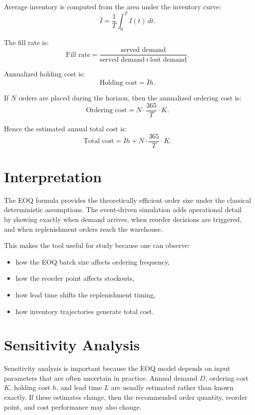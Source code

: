 \documentclass[11pt]{article}
\begin{document}
Average inventory is computed from the area under the inventory curve:
\begin{equation}
\bar{I} = \frac{1}{T}\int_0^T I(t)\,dt.
\end{equation}

The fill rate is:
\begin{equation}
\text{Fill rate} = \frac{\text{served demand}}{\text{served demand} + \text{lost demand}}.
\end{equation}

Annualized holding cost is:
\begin{equation}
\text{Holding cost} = \bar{I}h.
\end{equation}

If $N$ orders are placed during the horizon, then the annualized ordering cost is:
\begin{equation}
\text{Ordering cost} = N \cdot \frac{365}{T} \cdot K.
\end{equation}

Hence the estimated annual total cost is:
\begin{equation}
\text{Total cost} = \bar{I}h + N \cdot \frac{365}{T} \cdot K.
\end{equation}

\section{Interpretation}
The EOQ formula provides the theoretically efficient order size under the classical deterministic assumptions. The event-driven simulation adds operational detail by showing exactly when demand arrives, when reorder decisions are triggered, and when replenishment orders reach the warehouse.

This makes the tool useful for study because one can observe:
\begin{itemize}
  \item how the EOQ batch size affects ordering frequency,
  \item how the reorder point affects stockouts,
  \item how lead time shifts the replenishment timing,
  \item how inventory trajectories generate total cost.
\end{itemize}

\section{Sensitivity Analysis}
Sensitivity analysis is important because the EOQ model depends on input parameters that are often uncertain in practice. Annual demand $D$, ordering cost $K$, holding cost $h$, and lead time $L$ are usually estimated rather than known exactly. If these estimates change, then the recommended order quantity, reorder point, and cost performance may also change.
\end{document}
